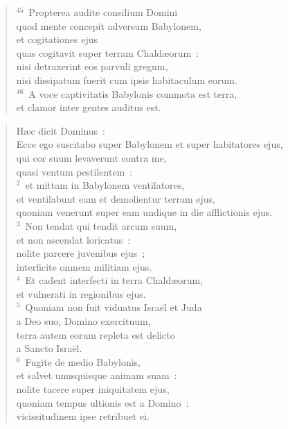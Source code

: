 \begin{flushleft}
\begin{verse}
${}^{45}$~Propterea audite consilium Domini\\ quod mente concepit adversum Babylonem,\\ et cogitationes ejus\\ quas cogitavit super terram Chald\ae orum~:\\ nisi detraxerint eos parvuli gregum,\\ nisi dissipatum fuerit cum ipsis habitaculum eorum.\\
${}^{46}$~A voce captivitatis Babylonis commota est terra,\\ et clamor inter gentes auditus est.\end{verse}\end{flushleft}


\begin{flushleft}\begin{verse}\vspace{-19pt}\hspace{6pt}H\ae c dicit Dominus~:\\\hspace{6pt} Ecce ego suscitabo super Babylonem et super habitatores ejus,\\ qui cor suum levaverunt contra me,\\ quasi ventum pestilentem~:\\
${}^{2}$~et mittam in Babylonem ventilatores,\\ et ventilabunt eam et demolientur terram ejus,\\ quoniam venerunt super eam undique in die afflictionis ejus.\\
${}^{3}$~Non tendat qui tendit arcum suum,\\ et non ascendat loricatus~:\\ nolite parcere juvenibus ejus~;\\ interficite omnem militiam ejus.\\
${}^{4}$~Et cadent interfecti in terra Chald\ae orum,\\ et vulnerati in regionibus ejus.\\
${}^{5}$~Quoniam non fuit viduatus Isra\"el et Juda\\ a Deo suo, Domino exercituum,\\ terra autem eorum repleta est delicto\\ a Sancto Isra\"el.\\
${}^{6}$~Fugite de medio Babylonis,\\ et salvet unusquisque animam suam~:\\ nolite tacere super iniquitatem ejus,\\ quoniam tempus ultionis est a Domino~:\\ vicissitudinem ipse retribuet ei.\\

\end{verse}
\end{flushleft}
